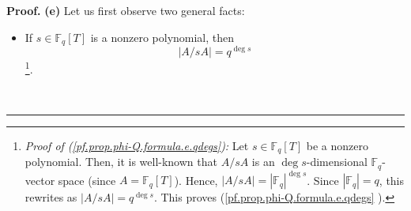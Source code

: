 \documentclass[numbers=enddot,12pt,final,onecolumn,notitlepage]{scrartcl}%
\theoremstyle{definition}
\newenvironment{proof}[1][Proof]{\noindent\textbf{#1.} }{\ \rule{0.5em}{0.5em}}
\begin{document}
\begin{proof}
\textbf{(e)} Let us first observe two general facts:

\begin{itemize}
\item If $s\in\mathbb{F}_{q}\left[  T\right]  $ is a nonzero polynomial, then%
\begin{equation}
\left\vert A/sA\right\vert =q^{\deg s} \label{pf.prop.phi-Q.formula.e.qdegs}%
\end{equation}
\footnote{\textit{Proof of (\ref{pf.prop.phi-Q.formula.e.qdegs}):} Let
$s\in\mathbb{F}_{q}\left[  T\right]  $ be a nonzero polynomial. Then, it is
well-known that $A/sA$ is an $\deg s$-dimensional $\mathbb{F}_{q}$-vector
space (since $A=\mathbb{F}_{q}\left[  T\right]  $). Hence, $\left\vert
A/sA\right\vert =\left\vert \mathbb{F}_{q}\right\vert ^{\deg s}$. Since
$\left\vert \mathbb{F}_{q}\right\vert =q$, this rewrites as $\left\vert
A/sA\right\vert =q^{\deg s}$. This proves (\ref{pf.prop.phi-Q.formula.e.qdegs}%
).}.


\end{itemize}
\end{proof}
\end{document}
